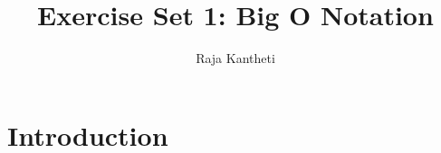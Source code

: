 \documentclass[12pt]{article}
\begin{document}
\title{Exercise Set 1: Big O Notation}
\author{Raja Kantheti}
\date{}
\maketitle

\section{Introduction}
\end{document}
